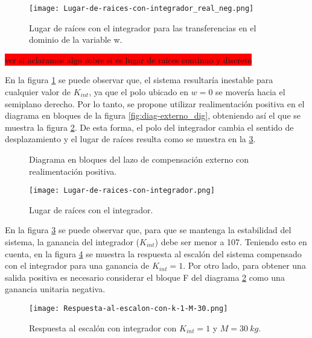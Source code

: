 \begin{figure}[H]
	\centering
	\texttt{[image: Lugar-de-raices-con-integrador\_real\_neg.png]}
	\caption{Lugar de raíces con el integrador para las transferencias en el dominio de la variable w.}
	\label{fig:lugar-de-raices-con-integrador_real_neg}
\end{figure}

\colorbox{red}{ver si aclaramos algo sobre si es lugar de raices continuo y discreto} 




En la figura \ref{fig:lugar-de-raices-con-integrador_real_neg} se puede observar que, el sistema resultaría inestable para cualquier valor de $K_{int}$, ya que el polo ubicado en $w=0$ se movería hacia el semiplano derecho. Por lo tanto, se propone utilizar realimentación positiva en el diagrama en bloques de la figura \ref{fig:diag-externo_dig}, obteniendo así el que se muestra la figura \ref{fig:diag-externo_real_positiva_dig}. De esta forma, el polo del integrador cambia el sentido de desplazamiento y el lugar de raíces resulta como se muestra en la \ref{fig:lugar-de-raices-con-integrador}.


\begin{figure}[H]
	\centering
	
	\caption{Diagrama en bloques del lazo de compensación externo con realimentación positiva.}	
	\label{fig:diag-externo_real_positiva_dig}
\end{figure}

\begin{figure}[H]
	\centering
	\texttt{[image: Lugar-de-raices-con-integrador.png]}
	\caption{Lugar de raíces con el integrador.}
	\label{fig:lugar-de-raices-con-integrador}
\end{figure}

\noindent En la figura \ref{fig:lugar-de-raices-con-integrador} se puede observar que, para que se mantenga la estabilidad del sistema, la ganancia del integrador ($K_{int}$) debe ser menor a 107. Teniendo esto en cuenta, en la figura \ref{fig:respuesta-al-escalon-con-k-1-M-30} se muestra la respuesta al escalón del sistema compensado con el integrador para una ganancia de $K_{int}=1$. Por otro lado, para obtener una salida positiva es necesario considerar el bloque F del diagrama \ref{fig:diag-externo_real_positiva_dig} como una ganancia unitaria negativa.


\begin{figure}[H]
	\centering
	\texttt{[image: Respuesta-al-escalon-con-k-1-M-30.png]}
	\caption{Respuesta al escalón con integrador con $K_{int} =1$ y $M=30\:kg$.}
	\label{fig:respuesta-al-escalon-con-k-1-M-30}
\end{figure}


